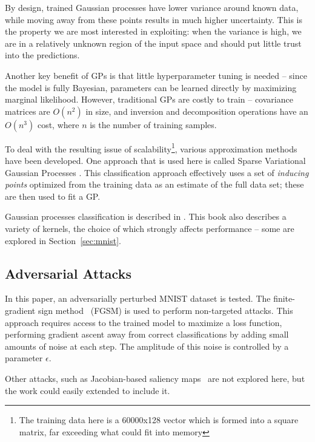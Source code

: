 \documentclass{article}
\begin{document}
By design, trained Gaussian processes have lower variance around known data, while moving away from these points results in much higher uncertainty. This is the property we are most interested in exploiting: when the variance is high, we are in a relatively unknown region of the input space and should put little trust into the predictions.

Another key benefit of GPs is that little hyperparameter tuning is needed -- since the model is fully Bayesian, parameters can be learned directly by maximizing marginal likelihood. However, traditional GPs are costly to train -- covariance matrices are $O(n^2)$ in size, and inversion and decomposition operations have an $O(n^3)$ cost, where $n$ is the number of training samples.

To deal with the resulting issue of scalability\footnote{The training data here is a 60000x128 vector which is formed into a square matrix, far exceeding what could fit into memory}, various approximation methods have been developed. One approach that is used here is called Sparse Variational Gaussian Processes \cite{hensman2015scalable}. This classification approach effectively uses a set of \textit{inducing points} optimized from the training data as an estimate of the full data set; these are then used to fit a GP.

Gaussian processes classification is described in \citet*{rasmussen2006gaussian}. This book also describes a variety of kernels, the choice of which strongly affects performance -- some are explored in Section~\ref{sec:mnist}. 

\subsection{Adversarial Attacks}
\label{sec:background:adv}
% 
In this paper, an adversarially perturbed MNIST dataset is tested. The finite-gradient sign method~\cite{goodfellow2014explaining} (FGSM) is used to perform non-targeted attacks. This approach requires access to the trained model to maximize a loss function, performing gradient ascent away from correct classifications by adding small amounts of noise at each step. The amplitude of this noise is controlled by a parameter $\epsilon$.

Other attacks, such as Jacobian-based saliency maps~\cite{papernot2016limitations} are not explored here, but the work could easily extended to include it.

\end{document}
